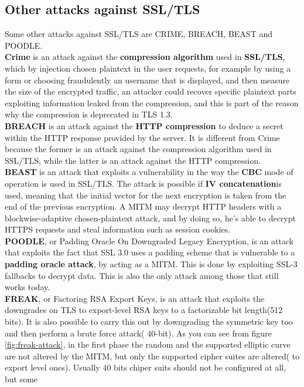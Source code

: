 \subsection{Other attacks against SSL/TLS}
Some other attacks against SSL/TLS are CRIME, BREACH, BEAST and
POODLE.\\
\textbf{Crime} is an attack against the \textbf{compression algorithm}
used in \textbf{SSL/TLS}, which by injection chosen plaintext in the
user requests, for example by using a form or choosing fraudulently an
username that is displayed, and then measure the size of the encrypted
traffic, an attacker could recover specific plaintext parts exploiting
information leaked from the compression, and this is part of the
reason why the compression is deprecated in TLS 1.3.\\
\textbf{BREACH} is an attack against the \textbf{HTTP compression} to
deduce a secret within the HTTP response provided by the server. It is
different from Crime because the former is an attack against the
compression algorithm used in SSL/TLS, while the latter is an attack
against the HTTP compression.\\
\textbf{BEAST} is an attack that exploits a vulnerability in the way
the \textbf{CBC} mode of operation is used in SSL/TLS. The attack is
possible if \textbf{IV concatenation}is used, meaning that the initial
vector for the next encryption is taken from the end of the previous
encryption. A MITM may decrypt HTTP headers with a blockwise-adaptive
chosen-plaintext attack, and by doing so, he's able to decrypt HTTPS
requests and steal information such as session cookies.\\
\textbf{POODLE}, or Padding Oracle On Downgraded Legacy Encryption, is
an attack that exploits the fact that SSL 3.0 uses a padding scheme
that is vulnerable to a \textbf{padding oracle attack}, by acting as a
MITM. This is done by exploiting SSL-3 fallbacks to decrypt data. This
is also the only attack among those that still works today.\\
\textbf{FREAK}, or Factoring RSA Export Keys, is an attack that
exploits the downgrades on TLS to export-level RSA keys to a
factorizable bit length(512 bits). It is also possible to carry this
out by downgrading the symmetric key too and then perform a brute
force attack( 40-bit). As you can see from figure
\ref{fig:freak-attack}, in the first phase the random and the
supported elliptic curve are not altered by the MITM, but only the
supported cipher suites are altered( to export level ones). Usually 40
bits chiper suits should not be configured at all, but some
